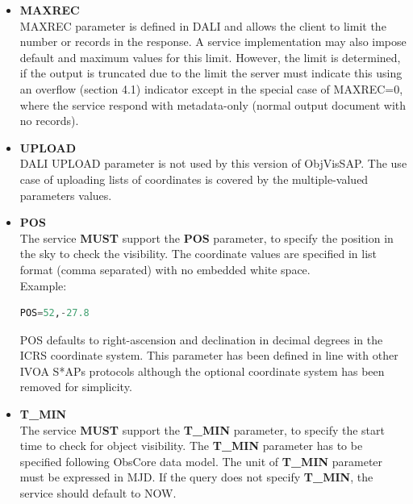 \documentclass[11pt,a4paper]{ivoa}
\begin{document}
\begin{itemize}
\item{\textbf{MAXREC}\\MAXREC parameter is defined in DALI and allows
the client to limit the number or records in the response. A service
implementation may also impose default and maximum values for this limit.
However, the limit is determined, if the output is truncated due to the
limit the server must indicate this using an overflow (section 4.1)
indicator except in the special case of MAXREC=0, where the service
respond with metadata-only (normal output document with no records).}

\item{\textbf{UPLOAD}\\DALI UPLOAD parameter is not used by this version
of ObjVisSAP. The use case of uploading lists of coordinates is covered
by the multiple-valued parameters values.}

\item{\textbf{POS}\\The service \textbf{MUST }support the
\textbf{POS} parameter, to specify the position in the sky to check the visibility. 
The coordinate values are specified in list format (comma separated) with no embedded white
space.\\
Example:\\
\begin{lstlisting}[language=SQL]
POS=52,-27.8
\end{lstlisting}
\par
POS defaults to right-ascension and declination in decimal degrees in
the ICRS coordinate system. This parameter has been defined in line with
other IVOA S*APs protocols although the optional coordinate system has
been removed for simplicity.}

\item{\textbf{T\_MIN}\\The service \textbf{MUST }support the
\textbf{T\_MIN }parameter, to specify the start time to check for object
visibility. The \textbf{T\_MIN }parameter has to be specified following
ObsCore data model. The unit of \textbf{T\_MIN} parameter must be
expressed in MJD. If the query does not specify \textbf{T\_MIN}, the service
should default to NOW.}


\end{itemize}
\end{document}
